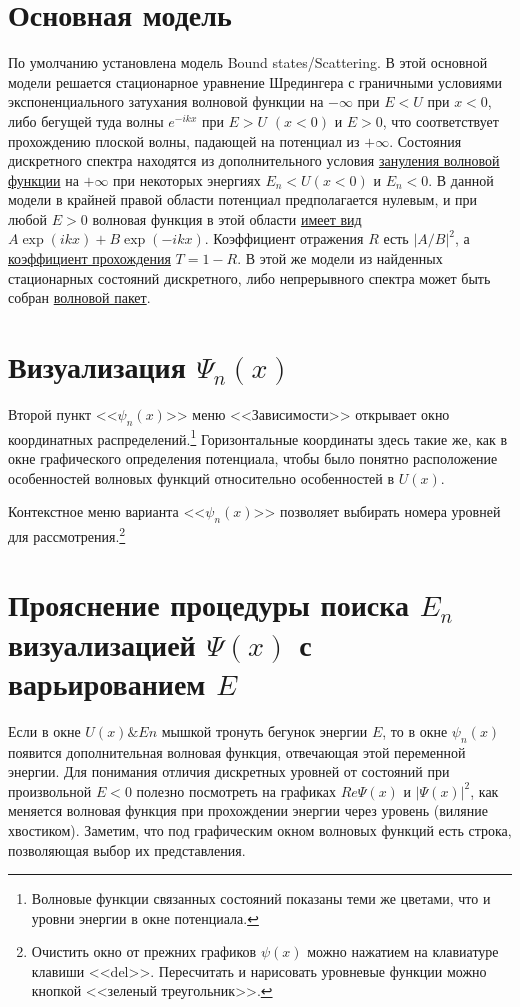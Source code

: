 \documentclass[12pt]{article}
\begin{document}
\hypertarget{main_model}{}\section{Основная модель}
По умолчанию установлена модель Bound states/Scattering.  В этой основной модели
решается стационарное уравнение Шредингера с граничными условиями
экспоненциального затухания волновой функции на $-\infty$ %
при $E<U$ при $x<0$,
либо бегущей туда волны $e^{-ikx}$ при $E>U$ $(x<0)$ и $E>0$, что соответствует прохождению
плоской волны, падающей на потенциал из $+\infty$. %
Состояния дискретного спектра
находятся из дополнительного условия \hyperlink{psinx_psix} {зануления волновой функции}
на $+\infty$ %
при некоторых энергиях $E_n<U(x<0)$  и $E_n<0$.
В данной модели в крайней правой области потенциал предполагается нулевым,
и при любой $E>0$ волновая функция в этой области \hyperlink{psixE} {имеет вид $A\exp(ikx)+B\exp(-ikx)$}.
Коэффициент отражения $R$ есть $|A/B|^2$, а \hyperlink{PsiandTE} {коэффициент прохождения} $T=1-R$.
В этой же модели из найденных стационарных состояний дискретного, либо
непрерывного спектра может быть собран \hyperlink{psixt} {волновой пакет}.







\hypertarget{psinx}{}\section[Визуализация волновых функций]{Визуализация $\Psi_n(x)$}
Второй пункт <<$\psi_n(x)$>> меню <<Зависимости>> открывает окно координатных распределений.\footnote[6]{Волновые функции связанных состояний показаны теми же цветами, что и уровни энергии в окне потенциала.}
Горизонтальные координаты здесь такие же, как в окне графического определения потенциала, чтобы было
понятно расположение особенностей волновых функций относительно особенностей в $U(x)$.

Контекстное меню варианта <<$\psi_n(x)$>> позволяет выбирать номера уровней для рассмотрения.\footnote[7]{Очистить окно от прежних графиков $\psi(x)$ можно нажатием на клавиатуре
клавиши <<del>>. Пересчитать и нарисовать уровневые функции можно кнопкой <<зеленый треугольник>>.}

\hypertarget{psinx_psix}{}\section[Прояснение процедуры поиска уровней]{Прояснение процедуры поиска $E_n$ визуализацией $\Psi(x)$ с варьированием $E$}
Если в окне $U(x)\&En$ мышкой тронуть бегунок энергии $E$, то в окне $\psi_n(x)$ появится дополнительная волновая функция,
отвечающая этой переменной энергии.
Для понимания отличия
дискретных уровней от состояний при произвольной $E<0$ полезно посмотреть на графиках $Re \Psi (x)$ и $|\Psi(x)|^2$, как меняется волновая функция при прохождении
энергии через уровень (виляние хвостиком). Заметим, что под  графическим окном волновых функций есть строка, позволяющая выбор их представления.
\end{document}

